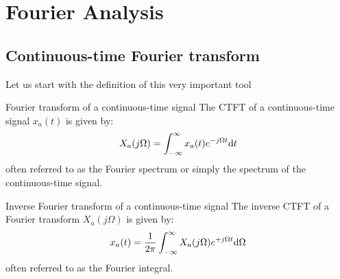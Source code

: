 \documentclass[../../main/main.tex]{subfiles}
\begin{document}
\chapter{Fourier Analysis}


\section{Continuous-time Fourier transform}
Let us start with the definition of this very important tool

\begin{definition}{Fourier transform of a continuous-time signal}
    The CTFT of a continuous-time signal \( x_{a}(t) \) is given by:
    \begin{equation}
        X_{a}(j\Omega)
        =
        \int_{-\infty}^{\infty} x_{a}(t) e^{-j\Omega t} \mathrm{d}{t}
        \label{eq:L08_S03_1}
    \end{equation}
    often referred to as the Fourier spectrum or simply the spectrum of the continuous-time signal.
\end{definition}

\begin{definition}{Inverse Fourier transform of a continuous-time signal}
    The inverse CTFT of a Fourier transform \( X_{a}(j\Omega) \) is given by:
    \begin{equation}
        x_{a}(t)
        =
        \frac{1}{2\pi} \int_{-\infty}^{\infty} X_{a}(j\Omega) e^{+j\Omega t} \mathrm{d}{\Omega}
        \label{eq:L08_S04_1}
    \end{equation}
    often referred to as the Fourier integral.
\end{definition}
\end{document}
